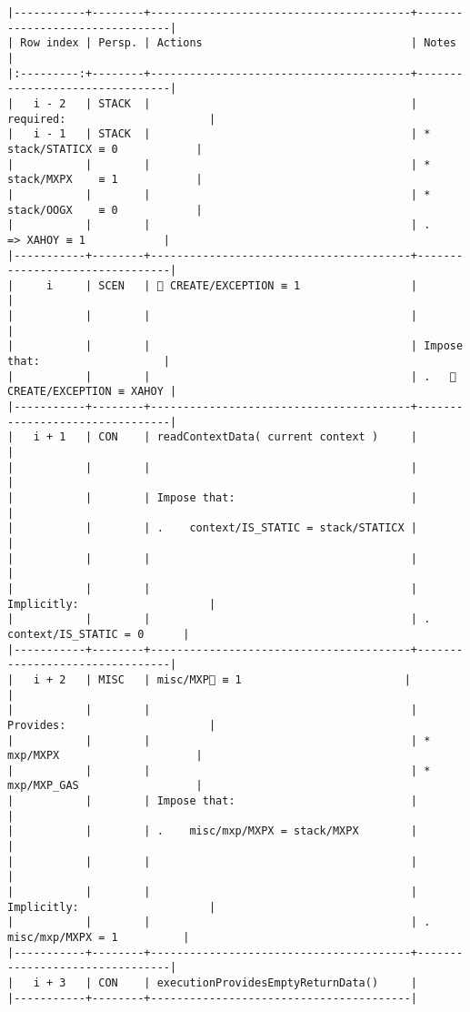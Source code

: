 \documentclass[varwidth=\maxdimen,margin=0.5cm,multi={verbatim}]{standalone}
\begin{document}
\begin{verbatim}
|-----------+--------+----------------------------------------+--------------------------------|
| Row index | Persp. | Actions                                | Notes                          |
|:---------:+--------+----------------------------------------+--------------------------------|
|   i - 2   | STACK  |                                        | required:                      |
|   i - 1   | STACK  |                                        | * stack/STATICX ≡ 0            |
|           |        |                                        | * stack/MXPX    ≡ 1            |
|           |        |                                        | * stack/OOGX    ≡ 0            |
|           |        |                                        | .      => XAHOY ≡ 1            |
|-----------+--------+----------------------------------------+--------------------------------|
|     i     | SCEN   |  CREATE/EXCEPTION ≡ 1                 |                                |
|           |        |                                        |                                |
|           |        |                                        | Impose that:                   |
|           |        |                                        | .    CREATE/EXCEPTION ≡ XAHOY |
|-----------+--------+----------------------------------------+--------------------------------|
|   i + 1   | CON    | readContextData( current context )     |                                |
|           |        |                                        |                                |
|           |        | Impose that:                           |                                |
|           |        | .    context/IS_STATIC = stack/STATICX |                                |
|           |        |                                        |                                |
|           |        |                                        | Implicitly:                    |
|           |        |                                        | .   context/IS_STATIC = 0      |
|-----------+--------+----------------------------------------+--------------------------------|
|   i + 2   | MISC   | misc/MXP🚩 ≡ 1                         |                                |
|           |        |                                        | Provides:                      |
|           |        |                                        | * mxp/MXPX                     |
|           |        |                                        | * mxp/MXP_GAS                  |
|           |        | Impose that:                           |                                |
|           |        | .    misc/mxp/MXPX = stack/MXPX        |                                |
|           |        |                                        |                                |
|           |        |                                        | Implicitly:                    |
|           |        |                                        | .   misc/mxp/MXPX = 1          |
|-----------+--------+----------------------------------------+--------------------------------|
|   i + 3   | CON    | executionProvidesEmptyReturnData()     |
|-----------+--------+----------------------------------------|

\end{verbatim}
\end{document}
